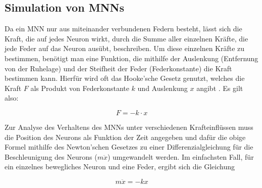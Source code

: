 \documentclass[10pt]{scrartcl}
\begin{document}

\FloatBarrier
\subsection{Simulation von MNNs}\label{sec:MNNSim}

Da ein MNN nur aus miteinander verbundenen Federn besteht, lässt sich die Kraft, die auf jedes Neuron wirkt, durch die Summe aller einzelnen Kräfte, die jede Feder auf das Neuron ausübt, beschreiben.
Um diese einzelnen Kräfte zu bestimmen, benötigt man eine Funktion, die mithilfe der Auslenkung (Entfernung von der Ruhelage) und der Steifheit der Feder (Federkonstante) die Kraft bestimmen kann.
Hierfür wird oft das Hooke'sche Gesetz genutzt, welches die Kraft $F$ als Produkt von Federkonstante $k$ und Auslenkung $x$ angibt \cite{wiki:hooke}. Es gilt also:

{\[
    F = -k \cdot x
\]}

Zur Analyse des Verhaltens des MNNs unter verschiedenen Krafteinflüssen muss die Position des Neurons als Funktion der Zeit angegeben und dafür die obige Formel mithilfe des Newton'schen Gesetzes zu einer Differenzialgleichung für die Beschleunigung des Neurons ($m \ddot x$) umgewandelt werden.
Im einfachsten Fall, für ein einzelnes bewegliches Neuron und eine Feder, ergibt sich die Gleichung 

{\[
m \ddot{x} = -k x
\]}


\end{document}
